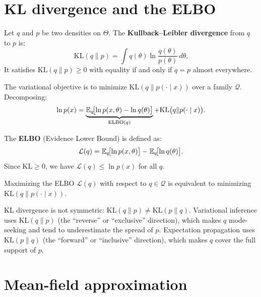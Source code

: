 \section{KL divergence and the ELBO}

\begin{definition}[KL divergence]
Let $q$ and $p$ be two densities on $\Theta$. The \textbf{Kullback--Leibler
divergence} from $q$ to $p$ is:
\[
  \mathrm{KL}(q \| p) = \int q(\theta) \ln \frac{q(\theta)}{p(\theta)}\,d\theta.
\]
It satisfies $\mathrm{KL}(q \| p) \geq 0$ with equality if and only if
$q = p$ almost everywhere.
\end{definition}

The variational objective is to minimize $\mathrm{KL}(q \| p(\cdot \mid x))$
over a family $\mathcal{Q}$. Decomposing:
\[
  \ln p(x) = \underbrace{\mathbb{E}_q\!\bigl[\ln p(x, \theta) - \ln q(\theta)\bigr]}_{\mathrm{ELBO}(q)}
              + \mathrm{KL}\bigl(q \| p(\cdot \mid x)\bigr).
\]

\begin{definition}
The \textbf{ELBO} (Evidence Lower Bound) is defined as:
\[
  \mathcal{L}(q) = \mathbb{E}_q\!\bigl[\ln p(x, \theta)\bigr] - \mathbb{E}_q\!\bigl[\ln q(\theta)\bigr].
\]
Since $\mathrm{KL} \geq 0$, we have $\mathcal{L}(q) \leq \ln p(x)$ for all $q$.
\end{definition}

\begin{theorem}
Maximizing the ELBO $\mathcal{L}(q)$ with respect to $q \in \mathcal{Q}$
is equivalent to minimizing $\mathrm{KL}(q \| p(\cdot \mid x))$.
\end{theorem}

\begin{attention}
KL divergence is not symmetric: $\mathrm{KL}(q \| p) \neq \mathrm{KL}(p \| q)$.
Variational inference uses $\mathrm{KL}(q \| p)$ (the ``reverse'' or ``exclusive'' direction),
which makes $q$ mode-seeking and tend to underestimate the spread of $p$. Expectation
propagation uses $\mathrm{KL}(p \| q)$ (the ``forward'' or ``inclusive'' direction),
which makes $q$ cover the full support of $p$.
\end{attention}

\section{Mean-field approximation}

